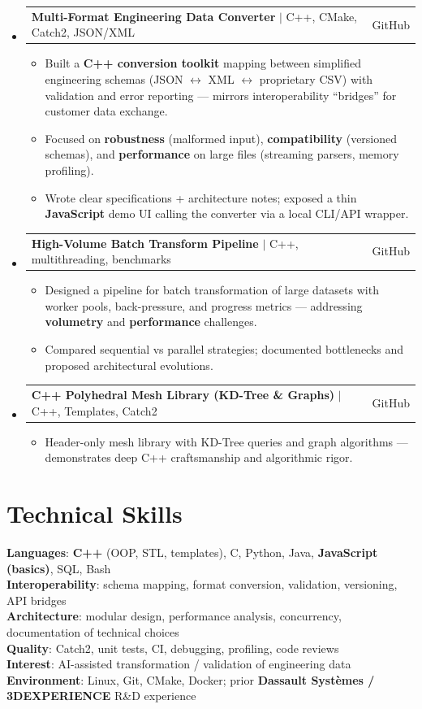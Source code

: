 \documentclass[letterpaper,11pt]{article}
\makeatletter
\newcommand{\resumeItem}[1]{\item\small{#1 \vspace{-2pt}}}
\newcommand{\resumeProjectHeading}[2]{
    \item
    \begin{tabular*}{0.97\textwidth}{l@{\extracolsep{\fill}}r}
      \small#1 & #2 \\
    \end{tabular*}\vspace{-7pt}
}
\newcommand{\resumeSubHeadingListStart}{\begin{itemize}[leftmargin=0.15in, label={}]}
\newcommand{\resumeSubHeadingListEnd}{\end{itemize}}
\newcommand{\resumeItemListStart}{\begin{itemize}[leftmargin=0.18in]}
\newcommand{\resumeItemListEnd}{\end{itemize}\vspace{-5pt}}
\makeatother
\begin{document}
\resumeSubHeadingListStart

  \resumeProjectHeading
    {\textbf{Multi-Format Engineering Data Converter} $|$ C++, CMake, Catch2, JSON/XML}{GitHub}
    \resumeItemListStart
      \resumeItem{Built a \textbf{C++ conversion toolkit} mapping between simplified engineering schemas (JSON $\leftrightarrow$ XML $\leftrightarrow$ proprietary CSV) with validation and error reporting --- mirrors interoperability ``bridges'' for customer data exchange.}
      \resumeItem{Focused on \textbf{robustness} (malformed input), \textbf{compatibility} (versioned schemas), and \textbf{performance} on large files (streaming parsers, memory profiling).}
      \resumeItem{Wrote clear specifications + architecture notes; exposed a thin \textbf{JavaScript} demo UI calling the converter via a local CLI/API wrapper.}
    \resumeItemListEnd

  \resumeProjectHeading
    {\textbf{High-Volume Batch Transform Pipeline} $|$ C++, multithreading, benchmarks}{GitHub}
    \resumeItemListStart
      \resumeItem{Designed a pipeline for batch transformation of large datasets with worker pools, back-pressure, and progress metrics --- addressing \textbf{volumetry} and \textbf{performance} challenges.}
      \resumeItem{Compared sequential vs parallel strategies; documented bottlenecks and proposed architectural evolutions.}
    \resumeItemListEnd

  \resumeProjectHeading
    {\textbf{C++ Polyhedral Mesh Library (KD-Tree \& Graphs)} $|$ C++, Templates, Catch2}{GitHub}
    \resumeItemListStart
      \resumeItem{Header-only mesh library with KD-Tree queries and graph algorithms --- demonstrates deep C++ craftsmanship and algorithmic rigor.}
    \resumeItemListEnd

\resumeSubHeadingListEnd

\section{Technical Skills}

\begin{itemize}[leftmargin=0.15in, label={}]
  \small{\item{
    \textbf{Languages}: \textbf{C++} (OOP, STL, templates), C, Python, Java, \textbf{JavaScript (basics)}, SQL, Bash \\
    \textbf{Interoperability}: schema mapping, format conversion, validation, versioning, API bridges \\
    \textbf{Architecture}: modular design, performance analysis, concurrency, documentation of technical choices \\
    \textbf{Quality}: Catch2, unit tests, CI, debugging, profiling, code reviews \\
    \textbf{Interest}: AI-assisted transformation / validation of engineering data \\
    \textbf{Environment}: Linux, Git, CMake, Docker; prior \textbf{Dassault Syst\`emes / 3DEXPERIENCE} R\&D experience
  }}
\end{itemize}
\end{document}
